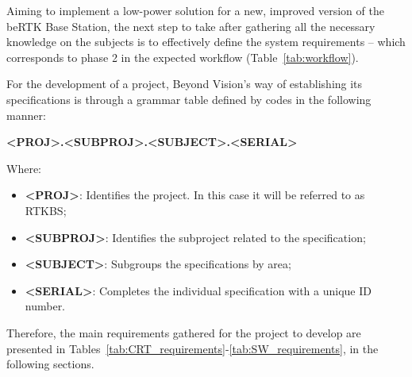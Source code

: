Aiming to implement a low-power solution for a new, improved version of the beRTK\textsuperscript{\textregistered} Base Station, the next step to take after gathering all the necessary knowledge on the subjects is to effectively define the system requirements -- which corresponds to phase 2 in the expected workflow (Table~\ref{tab:workflow}).

For the development of a project, Beyond Vision's way of establishing its specifications is through a grammar table defined by codes in the following manner:

\begin{center}
	\textbf{<PROJ>.<SUBPROJ>.<SUBJECT>.<SERIAL>}
\end{center}
Where:
\begin{itemize}
	\item \textbf{<PROJ>}: Identifies the project. In this case it will be referred to as RTKBS;
	\item \textbf{<SUBPROJ>}: Identifies the subproject related to the specification;
	\item \textbf{<SUBJECT>}: Subgroups the specifications by area;
	\item \textbf{<SERIAL>}: Completes the individual specification with a unique ID number.
\end{itemize}

Therefore, the main requirements gathered for the project to develop are presented in Tables~\ref{tab:CRT_requirements}-\ref{tab:SW_requirements}, in the following sections.

